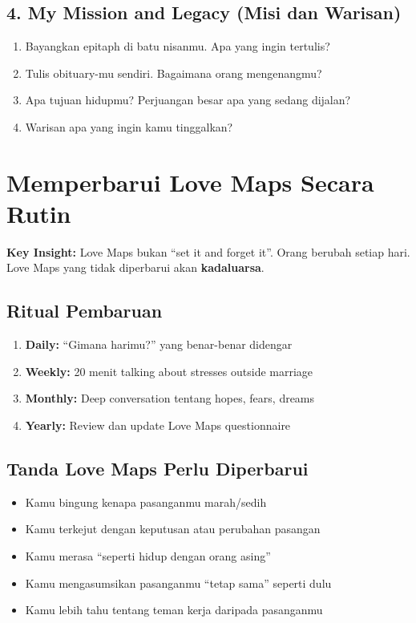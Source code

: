 \begin{exercisebox}
\subsection*{4. My Mission and Legacy (Misi dan Warisan)}
\begin{enumerate}
    \item Bayangkan epitaph di batu nisanmu. Apa yang ingin tertulis?
    \item Tulis obituary-mu sendiri. Bagaimana orang mengenangmu?
    \item Apa tujuan hidupmu? Perjuangan besar apa yang sedang dijalan?
    \item Warisan apa yang ingin kamu tinggalkan?
\end{enumerate}
\end{exercisebox}

\section{Memperbarui Love Maps Secara Rutin}

\begin{insightbox}
\textbf{Key Insight:} Love Maps bukan ``set it and forget it''. Orang berubah setiap hari. Love Maps yang tidak diperbarui akan \textbf{kadaluarsa}.
\end{insightbox}

\subsection{Ritual Pembaruan}

\begin{enumerate}
    \item \textbf{Daily:} ``Gimana harimu?'' yang benar-benar didengar
    \item \textbf{Weekly:} 20 menit talking about stresses outside marriage
    \item \textbf{Monthly:} Deep conversation tentang hopes, fears, dreams
    \item \textbf{Yearly:} Review dan update Love Maps questionnaire
\end{enumerate}

\subsection{Tanda Love Maps Perlu Diperbarui}

\begin{warningbox}
\begin{itemize}
    \item Kamu bingung kenapa pasanganmu marah/sedih
    \item Kamu terkejut dengan keputusan atau perubahan pasangan
    \item Kamu merasa ``seperti hidup dengan orang asing''
    \item Kamu mengasumsikan pasanganmu ``tetap sama'' seperti dulu
    \item Kamu lebih tahu tentang teman kerja daripada pasanganmu
\end{itemize}
\end{warningbox}

